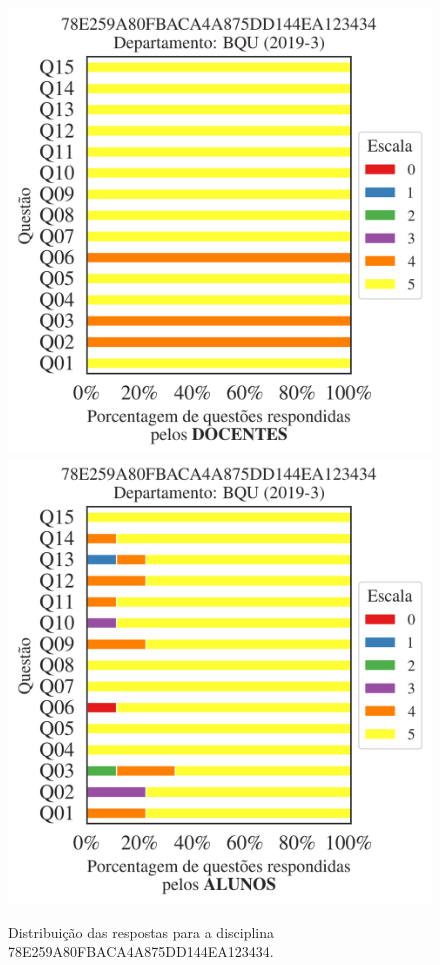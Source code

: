 \documentclass[a4paper,10pt]{article}
\begin{document}
\begin{figure}[h]
\centering
\includegraphics[width=0.485\linewidth]{analise_disciplina_departamento_BQU_78E259A80FBACA4A875DD144EA123434_docentes.png}
\includegraphics[width=0.485\linewidth]{analise_disciplina_departamento_BQU_78E259A80FBACA4A875DD144EA123434_alunos.png}
\caption{\label{fig:analise_geral_departamento}                Distribuição das respostas para a disciplina 78E259A80FBACA4A875DD144EA123434. }
\end{figure}
\end{document}
